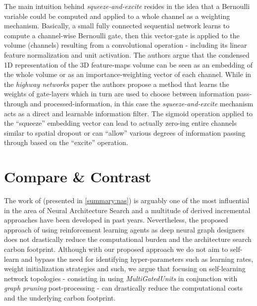 \documentclass[11pt,a4paper]{article}
\begin{document}
The main intuition behind \textit{squeeze-and-excite} resides in the idea that a Bernoulli variable could be computed and applied to a whole channel as a weighting mechanism. Basically, a small fully connected sequential network learns to compute a channel-wise Bernoulli gate, then this vector-gate  is applied to the volume (channels) resulting from a convolutional operation - including its linear feature normalization and unit activation. The authors argue that the condensed 1D representation of the 3D feature-maps volume can be seen as an embedding of the whole volume or as an importance-weighting vector of each channel. While in the \textit{highway networks} paper the authors propose a method that learns the weights of gate-layers which in turn are used to choose between information pass-through and processed-information, in this case the \textit{squeeze-and-excite} mechanism acts as a direct and learnable information filter. The sigmoid operation applied to the “squeeze” embedding vector can lead to actually zero-ing entire channels similar to spatial dropout or can “allow” various degrees of information passing through based on the “excite” operation.



\section{Compare \& Contrast}

The work of \citet{Zoph2017} (presented in \ref{summary:nas}) is arguably one of the most influential in the area of Neural Architecture Search and a multitude of derived incremental approaches have been developed in past years. Nevertheless, the proposed approach of using reinforcement learning agents as deep neural graph designers does not drastically reduce the computational burden and the architecture search carbon footprint. Although with our proposed approach we do not aim to self-learn and bypass the need for identifying hyper-parameters such as learning rates, weight initialization strategies and such, we argue that focusing on self-learning network topologies - consisting in using \textit{MultiGatedUnits} in conjunction with \textit{graph pruning} post-processing - can drastically reduce the computational costs and the underlying carbon footprint.
\end{document}

